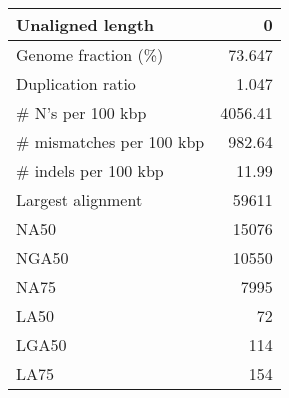 \documentclass[12pt,a4paper]{article}
\begin{document}
\begin{table}[ht]
\begin{center}
\begin{tabular}{|l*{1}{|r}|}
Unaligned length & 0 \\ \hline
Genome fraction (\%) & 73.647 \\ \hline
Duplication ratio & 1.047 \\ \hline
\# N's per 100 kbp & 4056.41 \\ \hline
\# mismatches per 100 kbp & 982.64 \\ \hline
\# indels per 100 kbp & 11.99 \\ \hline
Largest alignment & 59611 \\ \hline
NA50 & 15076 \\ \hline
NGA50 & 10550 \\ \hline
NA75 & 7995 \\ \hline
LA50 & 72 \\ \hline
LGA50 & 114 \\ \hline
LA75 & 154 \\ \hline
\end{tabular}
\end{center}
\end{table}
\end{document}
